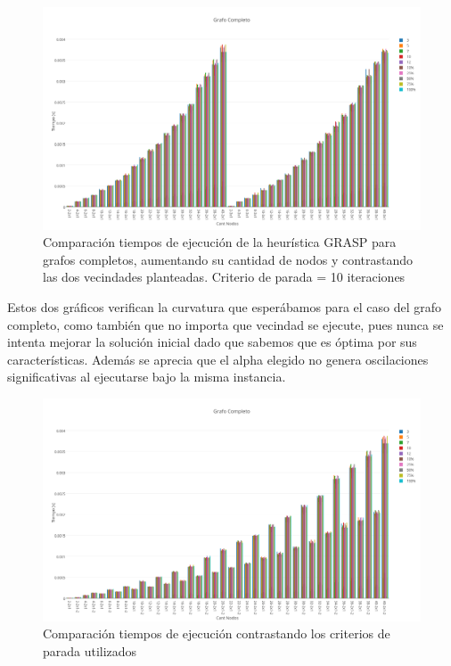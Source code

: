   \begin{figure}[h!]
   \begin{center}
 	\includegraphics[scale=0.35]{imagenes/grasp/completo-10repes.png}
 	\caption{Comparaci\'on tiempos de ejecuci\'on de la heur\'istica GRASP para grafos completos, aumentando su cantidad de nodos y contrastando las dos vecindades planteadas. Criterio de parada = 10 iteraciones}
   \end{center}
 \end{figure}
\newpage

Estos dos gr\'aficos verifican la curvatura que esper\'abamos para el caso del grafo completo, como tambi\'en que no importa que vecindad se ejecute, pues nunca se intenta mejorar la soluci\'on inicial dado que sabemos que es \'optima por sus caracter\'isticas. Adem\'as se aprecia que el alpha elegido no genera oscilaciones significativas al ejecutarse bajo la misma instancia.

  \begin{figure}[h!]
   \begin{center}
 	\includegraphics[scale=0.35]{imagenes/grasp/completo-5vs10.png}
 	\caption{Comparaci\'on tiempos de ejecuci\'on contrastando los criterios de parada utilizados}
   \end{center}
 \end{figure}

